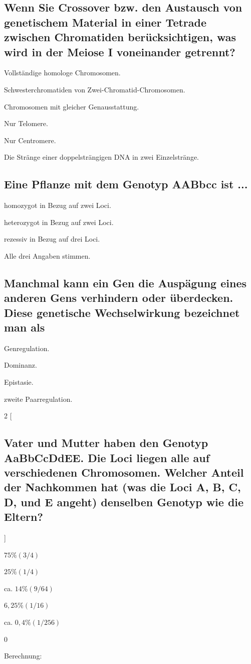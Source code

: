\documentclass{article}
\begin{document}
\subsection*{Wenn Sie Crossover bzw. den Austausch von genetischem Material in
einer Tetrade zwischen Chromatiden berücksichtigen, was wird in der
Meiose I voneinander getrennt?}
\begin{todolist} %
\item Vollständige homologe Chromosomen.
\item Schwesterchromatiden von Zwei-Chromatid-Chromosomen.  
\item Chromosomen mit gleicher Genausstattung.  
\item Nur Telomere.  
\item Nur Centromere.  
\item Die Stränge einer doppelsträngigen DNA in zwei Einzelstränge.  
\end{todolist}
\subsection*{Eine Pflanze mit dem Genotyp AABbcc ist ...}
\begin{todolist} %
\item homozygot in Bezug auf zwei Loci.
\item heterozygot in Bezug auf zwei Loci.  
\item rezessiv in Bezug auf drei Loci.  
\item Alle drei Angaben stimmen.  
\end{todolist}
\subsection*{Manchmal kann ein Gen die Auspägung eines anderen Gens verhindern
oder überdecken. Diese genetische Wechselwirkung bezeichnet man als}
\begin{todolist}%
\item Genregulation.
\item Dominanz.
\item Epistasie.
\item zweite Paarregulation.
\end{todolist}

\begin{multicols}{2}
[\subsection*{Vater und Mutter haben den Genotyp AaBbCcDdEE. Die Loci liegen alle
auf verschiedenen Chromosomen. Welcher Anteil der Nachkommen hat
(was die Loci A, B, C, D, und E angeht) denselben Genotyp wie die
Eltern?}]
\begin{todolist}
\item $75 \% (3/4)$
\item $25 \% (1/4)$
\item ca. $14 \% (9/64)$
\item $6,25 \% (1/16)$
\item ca. $0,4 \% (1/256)$
\item 0
\end{todolist}
\columnbreak
Berechnung: 
\end{multicols}
\end{document}
